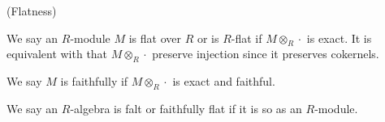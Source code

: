 \documentclass{article}
\begin{document}
\begin{definition}
    (Flatness)\par
    We say an $R$-module $M$ is flat over $R$ or is $R$-flat if $M\otimes_R \cdot$ is exact. It is equivalent with that $M\otimes_R \cdot$ preserve injection since it preserves cokernels.\par
    We say  $M$ is faithfully if $M\otimes_R \cdot$ is exact and faithful.\par
    We say an $R$-algebra is falt or faithfully flat if it is so as an $R$-module.
\end{definition}

\newpage




\end{document}
